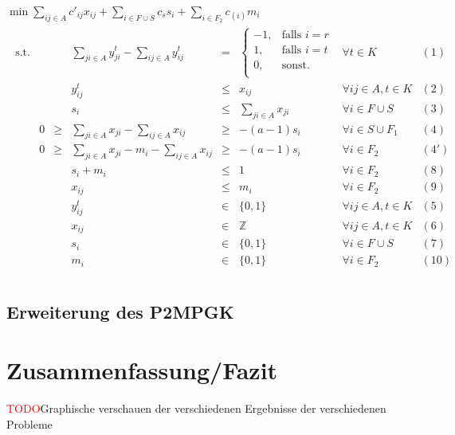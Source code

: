 \documentclass[11pt,a4paper]{article}
\newcommand{\Z}{\mathbb{Z}}
\newcommand{\TODO}{\textcolor{red}{TODO}}
\theoremstyle{my_th_style1}
\begin{document}
  \bigskip
  $\min \displaystyle\sum_{ij \in A} c'_{ij} x_{ij} + \displaystyle\sum_{i \in F \cup S} c_s s_i + \displaystyle\sum_{i \in F_2} c_(i) m_i$
  \begin{align*}
  \begin{array}{rcrcrcll}
  \textrm{s.t.}  
  && &\displaystyle\sum_{ji \in A} y_{ji}^t - \displaystyle\sum_{ij \in A} y_{ij}^t& = & \left\{\begin{array}{cl} 
  -1, & \text{falls } i=r\\ 
  1, & \text{falls } i=t\\ 
  0, & \text{sonst.}\\ 
  \end{array}
  \right. & \forall t \in K & (1) \\
  &&& y_{ij}^t & \leq & x_{ij} & \forall ij \in A, t\in K & (2)\\
    &&& s_i &\leq& \displaystyle\sum_{ji \in A} x_{ji}& \forall  i \in F \cup S & (3)\\ 
  &0&\geq&\displaystyle\sum_{ji \in A} x_{ji} - \displaystyle\sum_{ij \in A} x_{ij}&\geq& -(a-1)s_i & \forall i \in S \cup F_1& (4)\\
   &0&\geq&\displaystyle\sum_{ji \in A} x_{ji} -m_i - \displaystyle\sum_{ij \in A} x_{ij}&\geq& -(a-1)s_i & \forall i \in F_2& (4')\\
   &&&s_i+m_i & \leq & 1 & \forall i \in F_2 & (8)\\
   &&&x_{ij}& \leq & m_i & \forall i \in F_2 & (9) \\
    &&& y_{ij}^t & \in & \{0,1 \}& \forall ij \in A, t \in K & (5)\\
    &&& x_{ij} & \in & \Z & \forall ij \in A, t \in K & (6)\\
    &&& s_i & \in & \{ 0,1 \} & \forall i \in F \cup S & (7) \\
    &&& m_i & \in & \{ 0,1 \} & \forall i \in F_2 & (10) \\
  \end{array}
  \end{align*}
 \subsection{Erweiterung des P2MPGK}
 
 \section{Zusammenfassung/Fazit}
 \TODO Graphische verschauen der verschiedenen Ergebnisse der verschiedenen Probleme
 
\end{document}
